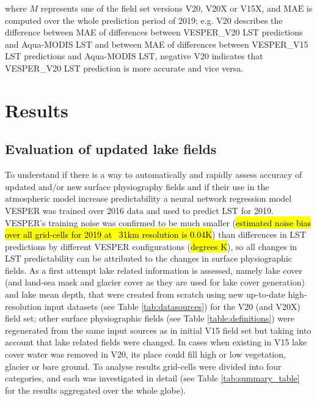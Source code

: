 \documentclass[hess, twostagejnl]{copernicus}
\begin{document}
where $M$ represents one of the field set versions V20, V20X or V15X, and $\text{MAE}$ is computed over the whole prediction period of 2019; e.g. V20 describes the difference between MAE of differences between VESPER\_V20 LST predictions and Aqua-MODIS LST and between MAE of differences between VESPER\_V15 LST predictions and Aqua-MODIS LST, negative V20 indicates that VESPER\_V20 LST prediction is more accurate and vice versa. 



\section{Results}

\subsection{Evaluation of updated lake fields}\label{sec:3}
To understand if there is a way to automatically and rapidly assess accuracy of updated and/or new surface physiography fields and if their use in the atmospheric model increase predictability a neural network regression model VESPER was trained over 2016 data and used to predict LST for 2019. VESPER’s training noise was confirmed to be much smaller (\hl{estimated noise bias over all grid-cells for 2019 at ~31km resolution is 0.04K}) than differences in LST predictions by different VESPER configurations (\hl{degrees K}), so all changes in LST predictability can be attributed to the changes in surface physiographic fields. As a first attempt lake related information is assessed, namely lake cover (and land-sea mask and glacier cover as they are used for lake cover generation) and lake mean depth, that were created from scratch using new up-to-date high-resolution input datasets (see Table \ref{tab:datasources}) for the V20 (and V20X) field set; other surface physiographic fields (see Table \ref{table:definitions}) were regenerated from the same input sources as in initial V15 field set but taking into account that lake related fields were changed. In cases when existing in V15 lake cover water was removed in V20, its place could fill high or low vegetation, glacier or bare ground. To analyse results grid-cells were divided into four categories, and each was investigated in detail (see Table \ref{tab:summary_table} for the results aggregated over the whole globe).
\end{document}
